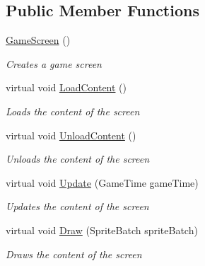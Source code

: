 \subsection*{Public Member Functions}
\begin{DoxyCompactItemize}
\item 
\hyperlink{class_hel_project_1_1_u_i_1_1_game_screen_a2061db8e78d29a972883b7e3fb47d71c}{Game\+Screen} ()
\begin{DoxyCompactList}\small\item\em Creates a game screen \end{DoxyCompactList}\item 
virtual void \hyperlink{class_hel_project_1_1_u_i_1_1_game_screen_aa4e15890ede3b8da390ffe0cecff3703}{Load\+Content} ()
\begin{DoxyCompactList}\small\item\em Loads the content of the screen \end{DoxyCompactList}\item 
virtual void \hyperlink{class_hel_project_1_1_u_i_1_1_game_screen_a97560de3aeb8b283fca89c1682ec778f}{Unload\+Content} ()
\begin{DoxyCompactList}\small\item\em Unloads the content of the screen \end{DoxyCompactList}\item 
virtual void \hyperlink{class_hel_project_1_1_u_i_1_1_game_screen_a4aefe31814b0081be3ba4f1243b8cee6}{Update} (Game\+Time game\+Time)
\begin{DoxyCompactList}\small\item\em Updates the content of the screen \end{DoxyCompactList}\item 
virtual void \hyperlink{class_hel_project_1_1_u_i_1_1_game_screen_ace6f51c0a6c5206a5c58cefd0eba2797}{Draw} (Sprite\+Batch sprite\+Batch)
\begin{DoxyCompactList}\small\item\em Draws the content of the screen \end{DoxyCompactList}\end{DoxyCompactItemize}
